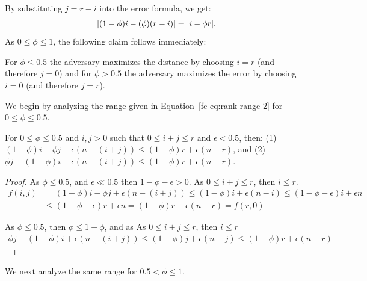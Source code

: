 By substituting $j=r-i$ into the error formula, we get:
\begin{align*}
    \lvert(1-\phi)i - (\phi)(r-i)\rvert=\lvert i - \phi r\rvert.
\end{align*}
As $0\leq \phi \leq 1$, the following claim follows immediately:
\begin{claim}
    For $\phi \leq 0.5$ the adversary maximizes the distance by choosing $i=r$ (and therefore $j=0$)
    and for $\phi > 0.5$ the adversary maximizes the error by choosing $i=0$ (and therefore $j=r$).
    \label{fc-clm:quantiles-relaxation-choice}
\end{claim}

We begin by analyzing the range given in Equation~\ref{fc-eq:rank-range-2} for $0 \leq \phi \leq 0.5$.

\begin{claim}
    For $0 \leq \phi \leq 0.5$ and $i,j>0$ such that $0 \leq i+j \leq r$ and $\epsilon < 0.5$, then: (1) $(1-\phi)i-\phi j + \epsilon(n-(i+j)) \leq (1-\phi) r + \epsilon(n-r)$,
    and (2) $\phi j - (1-\phi)i + \epsilon(n-(i+j)) \leq (1-\phi) r + \epsilon(n-r)$.
    \label{fc-clm:quantiles-bottom-half}
\end{claim}
\begin{proof}
    As $\phi \leq 0.5$, and $\epsilon \ll 0.5$ then $1-\phi-\epsilon > 0$. As $0 \leq i+j \leq r$, then $i \leq r$.
    \begin{align}
        f(i,j)&=(1-\phi)i-\phi j + \epsilon(n-(i+j)) \leq (1-\phi)i + \epsilon(n-i) \leq (1-\phi-\epsilon)i +\epsilon n \\
        &\leq (1-\phi-\epsilon)r +\epsilon n = (1-\phi)r+\epsilon(n-r) = f(r,0)
    \end{align}

    As $\phi \leq 0.5$, then $\phi \leq 1-\phi$, and as As $0 \leq i+j \leq r$, then $i \leq r$
    \begin{align}
        \phi j - (1-\phi)i + \epsilon(n-(i+j)) \leq (1-\phi )j +\epsilon (n-j)  \leq (1-\phi) r + \epsilon (n-r)
    \end{align}
\end{proof}


We next analyze the same range for $0.5 < \phi \leq 1$.

